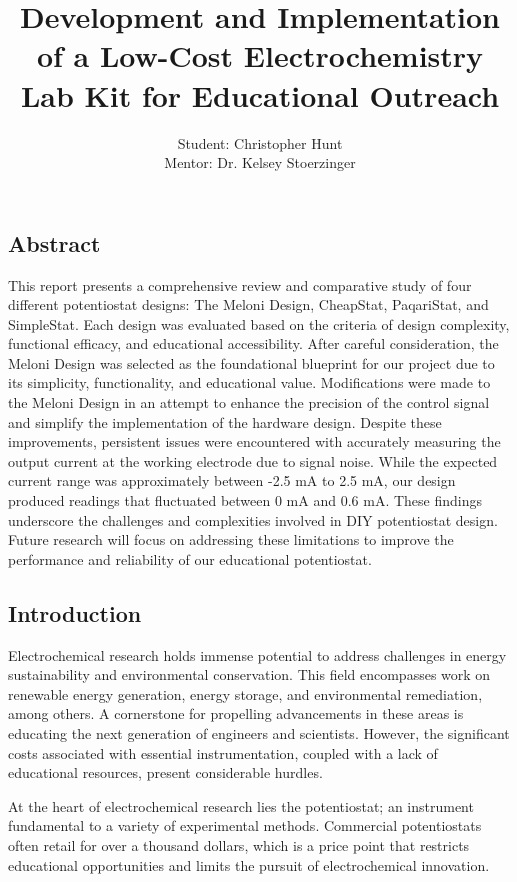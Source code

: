 \documentclass{article}
\title{\textcolor{mycolor}{\textbf{{\huge Development and Implementation of a Low-Cost Electrochemistry Lab Kit for Educational Outreach}}}}
\author{Student: Christopher Hunt \\ Mentor: Dr. Kelsey Stoerzinger}
\date{}
\begin{document}
\pagestyle{fancy}
\fancyhf{}
\rfoot{}
\rhead{\thepage}
\maketitle

\subsection*{Abstract}

This report presents a comprehensive review and comparative study of four different potentiostat designs: The Meloni Design, CheapStat, PaqariStat, and SimpleStat. Each design was evaluated based on the criteria of design complexity, functional efficacy, and educational accessibility. After careful consideration, the Meloni Design was selected as the foundational blueprint for our project due to its simplicity, functionality, and educational value. Modifications were made to the Meloni Design in an attempt to enhance the precision of the control signal and simplify the implementation of the hardware design. Despite these improvements, persistent issues were encountered with accurately measuring the output current at the working electrode due to signal noise. While the expected current range was approximately between -2.5 mA to 2.5 mA, our design produced readings that fluctuated between 0 mA and 0.6 mA. These findings underscore the challenges and complexities involved in DIY potentiostat design. Future research will focus on addressing these limitations to improve the performance and reliability of our educational potentiostat.

\subsection*{Introduction}
Electrochemical research holds immense potential to address challenges in energy sustainability and environmental conservation. This field encompasses work on renewable energy generation, energy storage, and environmental remediation, among others. A cornerstone for propelling advancements in these areas is educating the next generation of engineers and scientists. However, the significant costs associated with essential instrumentation, coupled with a lack of educational resources, present considerable hurdles.

At the heart of electrochemical research lies the potentiostat; an instrument fundamental to a variety of experimental methods. Commercial potentiostats often retail for over a thousand dollars, which is a price point that restricts educational opportunities and limits the pursuit of electrochemical innovation.
\end{document}
